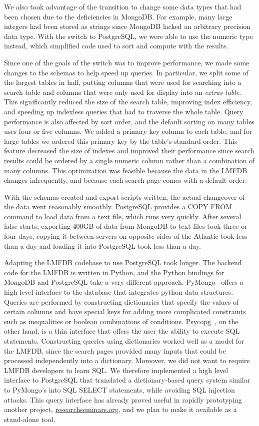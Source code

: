 \documentclass{amsart}
\begin{document}
We also took advantage of the transition to change some data types that had been chosen due to the deficiencies in MongoDB.
For example, many large integers had been stored as strings since MongoDB lacked an arbitrary precision data type.
With the switch to PostgreSQL, we were able to use the numeric type instead, which simplified code used to sort and compute with the results.

Since one of the goals of the switch was to improve performance, we made some changes to the schemas to help speed up queries.
In particular, we split some of the largest tables in half, putting columns that were used for searching into a search table and columns that were only used for display into an \emph{extras table}.
This significantly reduced the size of the search table, improving index efficiency, and speeding up indexless queries that had to traverse the whole table.
Query performance is also affected by sort order, and the default sorting on many tables uses four or five columns.
We added a primary key column to each table, and for large tables we ordered this primary key by the table's standard order.
This feature decreased the size of indexes and improved their performance since search results could be ordered by a single numeric column rather than a combination of many columns.
This optimization was feasible because the data in the LMFDB changes infrequently, and because each search page comes with a default order.

With the schemas created and export scripts written, the actual changeover of the data went reasonably smoothly.
PostgreSQL provides a COPY FROM command to load data from a text file, which runs very quickly.
After several false starts, exporting 400GB of data from MongoDB to text files took three or four days, copying it between servers on opposite sides of the Atlantic took less than a day and loading it into PostgreSQL took less than a day.

Adapting the LMFDB codebase to use PostgreSQL took longer.
The backend code for the LMFDB is written in Python, and the Python bindings for MongoDB and PostgreSQL take a very different approach.
PyMongo~\cite{pymongo} offers a high level interface to the database that integrates python data structures.
Queries are performed by constructing dictionaries that specify the values of certain columns and have special keys for adding more complicated constraints such as inequalities or boolean combinations of conditions.
Psycopg~\cite{psycopg}, on the other hand, is a thin interface that offers the user the ability to execute SQL statements.
Constructing queries using dictionaries worked well as a model for the LMFDB, since the search pages provided many inputs that could be processed independently into a dictionary.
Moreover, we did not want to require LMFDB developers to learn SQL.
We therefore implemented a high level interface to PostgreSQL that translated a dictionary-based query system similar to PyMongo's into SQL SELECT statements, while avoiding SQL injection attacks.
This query interface has already proved useful in rapidly prototyping another project, \href{https://researchseminars.org}{researchseminars.org}, and we plan to make it available as a stand-alone tool.
\end{document}
